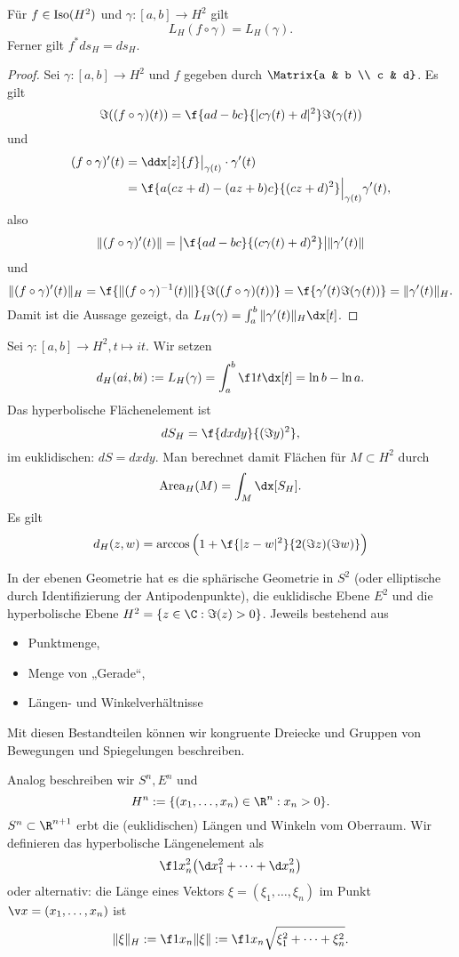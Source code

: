 \begin{lem}
	Für $f \in \operatorname{Iso}(H^2)$ und $\gamma: [a,b] \to H^2$ gilt
	\[
		L_H(f \circ \gamma) = L_H(\gamma).
	\]
	Ferner gilt $f^* ds_H = ds_H$.
	\begin{proof}
		Sei $\gamma: [a,b] \to H^2$ und $f$ gegeben durch $\Matrix{a & b \\ c & d}$.
		Es gilt
		\[
			\Im((f\circ \gamma)(t))
			= \f {ad - bc}{|c \gamma(t) + d|^2} \Im(\gamma(t))
		\]
		und
		\begin{align*}
			(f\circ \gamma)'(t)
			&= \ddx[z]{f}\big|_{\gamma(t)} \cdot \gamma'(t) \\
			&= \f{a(cz + d) - (az + b)c}{(cz + d)^2} \Big|_{\gamma(t)} \gamma'(t),
		\end{align*}
		also
		\[
			\|(f\circ \gamma)'(t)\|
			= \big| \f{ad - bc}{(c \gamma(t) + d)^2} \big| \|\gamma'(t)\|
		\]
		und
		\[
			\|(f\circ \gamma)'(t)\|_H
			= \f {\|(f\circ \gamma)^{-1}(t)\|}{\Im((f\circ \gamma)(t))}
			= \f {\gamma'(t){\Im(\gamma(t))}}
			= \| \gamma'(t)\|_H.
		\]
		Damit ist die Aussage gezeigt, da $L_H(\gamma) = \int_a^b \|\gamma'(t)\|_H \dx[t]$.
	\end{proof}
\end{lem}

Sei $\gamma: [a,b] \to H^2, t \mapsto it$.
Wir setzen
\[
	d_H(ai, bi) := L_H(\gamma)
	= \int_a^b \f 1t \dx[t]
	= \ln b - \ln a.
\]
Das hyperbolische Flächenelement ist
\[
	dS_H = \f {dx dy}{(\Im y)^2},
\]
im euklidischen: $dS = dxdy$.
Man berechnet damit Flächen für $M \subset H^2$ durch
\[
	\Area_H(M)
	= \int_M \dx[S_H].
\]
Es gilt
\[
	d_H(z, w)
	= \arccos\Big( 1 + \f{|z-w|^2}{2(\Im z)(\Im w)}\Big)
\]


In der ebenen Geometrie hat es die sphärische Geometrie in $S^2$ (oder elliptische durch Identifizierung der Antipodenpunkte), die euklidische Ebene $E^2$ und die hyperbolische Ebene $H^2 = \{ z \in \C : \Im(z) > 0 \}$.
Jeweils bestehend aus
\begin{itemize}
	\item
		Punktmenge,
	\item
		Menge von „Gerade“,
	\item
		Längen- und Winkelverhältnisse
\end{itemize}
Mit diesen Bestandteilen können wir kongruente Dreiecke und Gruppen von Bewegungen und Spiegelungen beschreiben.

Analog beschreiben wir $S^n, E^n$ und
\[
	H^n := \{ (x_1, \dotsc, x_n) \in \R^n : x_n > 0 \}.
\]
$S^n \subset \R^{n+1}$ erbt die (euklidischen) Längen und Winkeln vom Oberraum.
Wir definieren das hyperbolische Längenelement als
\[
	\f 1{x_n^2} \big( \d x_1^2 + \dotsb + \d x_n^2 \big)
\]
oder alternativ: die Länge eines Vektors $\xi = (\xi_1, \dotsc, \xi_n)$ im Punkt $\v x = (x_1, \dotsc, x_n)$ ist
\[
	\|\xi\|_H
	:= \f 1{x_n} \|\xi\|
	:=\f 1{x_n} \sqrt{\xi_1^2 + \dotsb + \xi_n^2}.
\]

